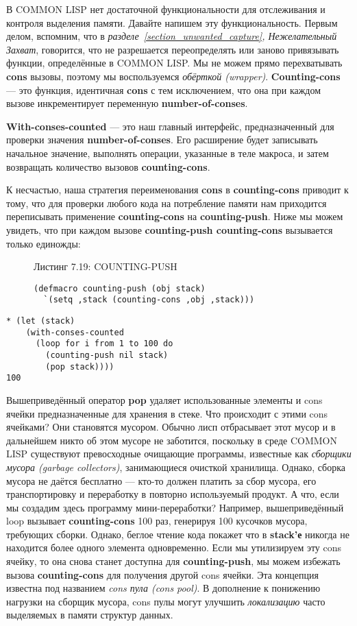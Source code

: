 В COMMON LISP нет достаточной функциональности для отслеживания и контроля выделения памяти. Давайте напишем эту функциональность. Первым делом, вспомним, что в \emph{разделе~\ref{section_unwanted_capture}, Нежелательный Захват}, говорится, что не разрешается переопределять или заново привязывать функции, определённые в COMMON LISP. Мы не можем прямо перехватывать \textbf{cons} вызовы, поэтому мы воспользуемся \emph{обёрткой (wrapper)}. \textbf{Counting-cons} --- это функция, идентичная \textbf{cons} с тем исключением, что она при каждом вызове инкрементирует переменную \textbf{number-of-conses}.

\textbf{With-conses-counted} --- это наш главный интерфейс, предназначенный для проверки значения \textbf{number-of-conses}. Его расширение будет записывать начальное значение, выполнять операции, указанные в теле макроса, и затем возвращать количество вызовов \textbf{counting-cons}.

К несчастью, наша стратегия переименования \textbf{cons} в \textbf{counting-cons} приводит к тому, что для проверки любого кода на потребление памяти нам приходится переписывать применение \textbf{counting-cons} на \textbf{counting-push}. Ниже мы можем увидеть, что при каждом вызове \textbf{counting-push counting-cons} вызывается только единожды:

\begin{figure}Листинг 7.19: COUNTING-PUSH\label{listing_7.19}
\listbegin
\begin{verbatim}
(defmacro counting-push (obj stack)
  `(setq ,stack (counting-cons ,obj ,stack)))
\end{verbatim}
\listend
\end{figure}

\begin{verbatim}
* (let (stack)
    (with-conses-counted
      (loop for i from 1 to 100 do
        (counting-push nil stack)
        (pop stack))))
100
\end{verbatim}

Вышеприведённый оператор \textbf{pop} удаляет использованные элементы и cons ячейки предназначенные для хранения в стеке. Что происходит с этими cons ячейками? Они становятся мусором. Обычно лисп отбрасывает этот мусор и в дальнейшем никто об этом мусоре не заботится, поскольку в среде COMMON LISP существуют превосходные очищающие программы, известные как \emph{сборщики мусора (garbage collectors)}, занимающиеся очисткой хранилища. Однако, сборка мусора не даётся бесплатно --- кто-то должен платить за сбор мусора, его транспортировку и переработку в повторно используемый продукт. А что, если мы создадим здесь программу мини-переработки? Например, вышеприведённый loop вызывает \textbf{counting-cons} 100 раз, генерируя 100 кусочков мусора, требующих сборки. Однако, беглое чтение кода покажет что в \textbf{stack'е} никогда не находится более одного элемента одновременно. Если мы утилизируем эту cons ячейку, то она снова станет доступна для \textbf{counting-push}, мы можем избежать вызова \textbf{counting-cons} для получения другой cons ячейки. Эта концепция известна под названием \emph{cons пула (cons pool)}. В дополнение к понижению нагрузки на сборщик мусора, cons пулы могут улучшить \emph{локализацию} часто выделяемых в памяти структур данных.

